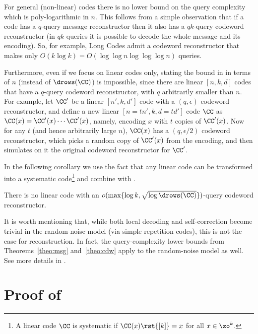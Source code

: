 \begin{remark} \label{rmk:whyrows}
For general (non-linear) codes there is no lower bound on the query complexity which is poly-logarithmic in $n$. This follows from a simple observation that if a code has a $q$-query message reconstructor then it also has a $qk$-query codeword reconstructor (in $qk$ queries it is possible to decode the whole message and its encoding). So, for example, Long Codes admit a codeword reconstructor that makes
only $O(k\log k) = O(\log \log n \log \log \log n)$ queries.

Furthermore, even if we focus on linear codes only, stating the bound in  in terms of $n$ (instead of $\drows(\CC)$) is impossible, since there are linear $[n,k,d]$ codes that have a $q$-query codeword reconstructor, with $q$ arbitrarily smaller than $n$. For example, let $\CC'$ be a linear $[n',k,d']$ code
with a $(q,\epsilon)$ codeword reconstructor, and define a new linear $[n=tn',k,d=td']$ code $\CC$ as $\CC(x) = \CC'(x) \cdots \CC'(x)$, namely, encoding $x$ with $t$ copies of $\CC'(x)$. Now for any $t$ (and hence arbitrarily large $n$), $\CC(x)$ has a $(q,\epsilon/2)$ codeword reconstructor, which picks a random copy of $\CC'(x)$ from the encoding, and then simulates on it the original codeword reconstructor for $\CC'$.
\end{remark}

In the following corollary we use the fact that any linear code can be transformed into a systematic code\footnote{A linear code $\CC$ is systematic if  $\CC(x)\rst{[k]} = x$ for all $x \in \zo^k$.} and combine  with .

\begin{corollary}
There is no linear code with an $o(\max\{\log k,\sqrt{\log \drows(\CC)}\})$-query codeword reconstructor.
\end{corollary}

It is worth mentioning that, while both local decoding and 
%
self-correction
become trivial in the random-noise model (via simple repetition codes), this is not the case for reconstruction. In fact, the query-complexity lower bounds from Theorems~\ref{theo:msg} and~\ref{theo:cdw} apply to the random-noise model as well. See more details in .

\section{Proof of } \label{sec:msg}

